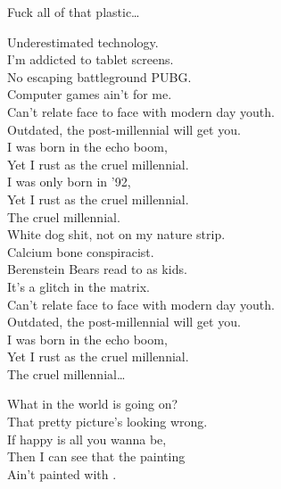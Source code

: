 Fuck all of that plastic… \\





Underestimated technology. \\
I'm addicted to tablet screens. \\
No escaping battleground PUBG. \\
Computer games ain't for me. \\

Can't relate face to face with modern day youth. \\
Outdated, the post-millennial will get you. \\
I was born in the echo boom, \\
Yet I rust as the cruel millennial. \\

I was only born in '92, \\
Yet I rust as the cruel millennial. \\
The cruel millennial. \\

White dog shit, not on my nature strip. \\
Calcium bone conspiracist. \\
Berenstein Bears read to as kids. \\
It's a glitch in the matrix. \\

Can't relate face to face with modern day youth. \\
Outdated, the post-millennial will get you. \\
I was born in the echo boom, \\
Yet I rust as the cruel millennial. \\

The cruel millennial… \\





What in the world is going on? \\
That pretty picture's looking wrong. \\
If happy is all you wanna be, \\
Then I can see that the painting \\
Ain't painted with . \\

